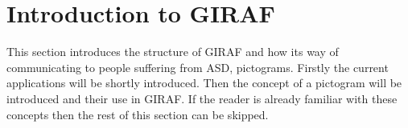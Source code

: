 \section{Introduction to GIRAF}\label{sec:giraf-intro}
This section introduces the structure of GIRAF and how its way of communicating to people suffering from ASD, pictograms.
Firstly the current applications will be shortly introduced.
Then the concept of a pictogram will be introduced and their use in GIRAF.
If the reader is already familiar with these concepts then the rest of this section can be skipped.




